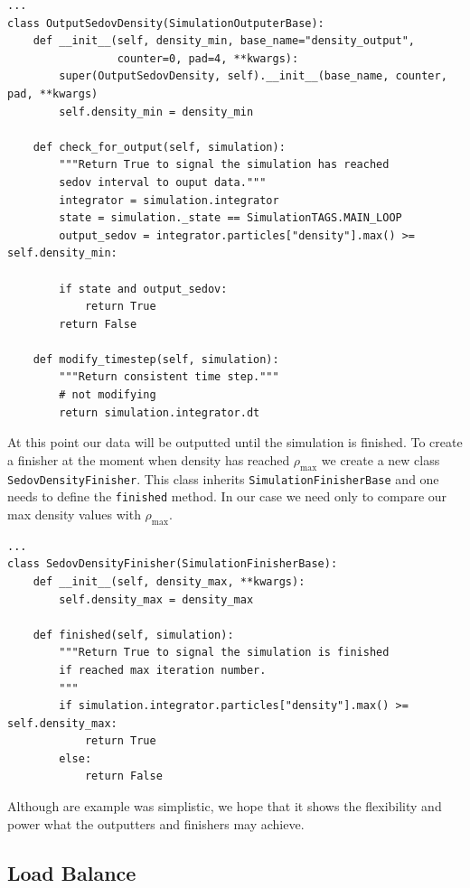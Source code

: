 \begin{lstlisting}
...
class OutputSedovDensity(SimulationOutputerBase):
    def __init__(self, density_min, base_name="density_output",
                 counter=0, pad=4, **kwargs):
        super(OutputSedovDensity, self).__init__(base_name, counter, pad, **kwargs)
        self.density_min = density_min 

    def check_for_output(self, simulation):
        """Return True to signal the simulation has reached
        sedov interval to ouput data."""
        integrator = simulation.integrator
        state = simulation._state == SimulationTAGS.MAIN_LOOP
        output_sedov = integrator.particles["density"].max() >= self.density_min:

        if state and output_sedov:
            return True
        return False

    def modify_timestep(self, simulation):
        """Return consistent time step."""
        # not modifying
        return simulation.integrator.dt

\end{lstlisting}
At this point our data will be outputted until the simulation is finished. To
create a finisher at the moment when density has reached $\rho_{\mathrm{max}}$
we create a new class \lstinline{SedovDensityFinisher}. This class inherits
\lstinline{SimulationFinisherBase} and one needs to define the \lstinline{finished}
method. In our case we need only to compare our max density values with
$\rho_{\mathrm{max}}$.
\begin{lstlisting}
...
class SedovDensityFinisher(SimulationFinisherBase):
    def __init__(self, density_max, **kwargs):
        self.density_max = density_max

    def finished(self, simulation):
        """Return True to signal the simulation is finished
        if reached max iteration number.
        """
        if simulation.integrator.particles["density"].max() >= self.density_max:
            return True
        else:
            return False

\end{lstlisting}

Although are example was simplistic, we hope that it shows the flexibility and power
what the outputters and finishers may achieve.  

\subsection{Load Balance}

